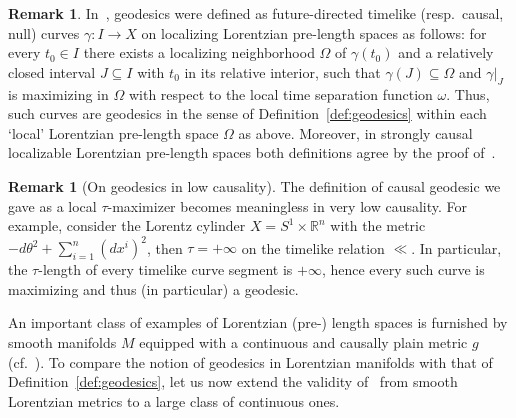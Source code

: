 \documentclass[a4paper,11pt]{article}
\numberwithin{equation}{section}
\theoremstyle{plain}
\theoremstyle{definition}
\newtheorem{Remark}[Definition]{Remark}
\newcommand{\R}{\mathbb R}
\begin{document}
\begin{Remark} \label{Remark: geodesicsvssolutionsofgeodeq} 
In~\cite[Def.\ 4.1]{grant2019inextendibility}, geodesics were defined as future-directed timelike (resp.\ causal, null) curves $\gamma \colon I \to X$ on localizing Lorentzian pre-length spaces as follows: for every $t_0 \in I$ there exists a localizing neighborhood $\Omega$ of $\gamma(t_0)$ and a relatively closed interval $J \subseteq I$ with $t_0$ in its relative interior, such that $\gamma(J) \subseteq \Omega$ and $\gamma|_J$ is maximizing in $\Omega$ with respect to the local time separation function $\omega$. Thus, such curves are geodesics in the sense of Definition~\ref{def:geodesics} within each `local' Lorentzian pre-length space $\Omega$ as above. Moreover, in strongly causal localizable Lorentzian pre-length spaces both definitions agree by the proof of~\cite[Lem.\ 4.3]{grant2019inextendibility}.
\end{Remark}

\begin{Remark}[On geodesics in low causality]
The definition of causal geodesic we gave as a local $\tau$-maximizer becomes meaningless in very low causality. For example, consider the Lorentz cylinder $X = S^1 \times \R^n$ with the metric $-d\theta^2 + \sum_{i=1}^n (dx^i)^2$, then $\tau = +\infty$ on the timelike relation $\ll$. In particular, the $\tau$-length of every timelike curve segment is $+\infty$, hence every such curve is maximizing and thus (in particular) a geodesic.
\end{Remark}


An important class of examples of Lorentzian (pre-) length spaces is furnished by smooth manifolds $M$ equipped with a continuous and causally plain metric $g$ (cf.\ \cite[Prop.\ 5.8]{kunzinger2018lorentzian}). To compare the notion of geodesics in Lorentzian manifolds with that of Definition~\ref{def:geodesics}, let us now extend the validity of~\cite[Prop.\ 2.32]{kunzinger2018lorentzian}
from smooth Lorentzian metrics to a large class of continuous ones. 
\end{document}
